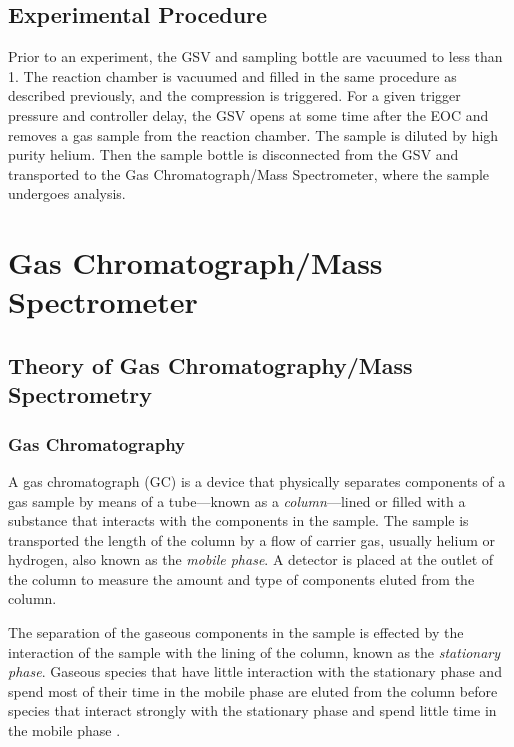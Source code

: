 \documentclass[../main.tex]{subfiles}
\begin{document}

\subsection{Experimental Procedure}

Prior to an experiment, the GSV and sampling bottle are vacuumed to less
than \SI{1}{\torr}. The reaction chamber is vacuumed and filled in the same
procedure as described previously, and the compression is triggered. For a given
trigger pressure and controller delay, the GSV opens at some time after the EOC
and removes a gas sample from the reaction chamber. The sample is diluted by
high purity helium. Then the sample bottle is disconnected from the GSV and transported
to the Gas Chromatograph/Mass Spectrometer, where the sample undergoes analysis.

\section{Gas Chromatograph/Mass Spectrometer}
\label{sec:gcms}

\subsection{Theory of Gas Chromatography/Mass Spectrometry}
\label{sec:gcms-theory}

\subsubsection{Gas Chromatography}

A gas chromatograph (GC) is a device that physically separates components
of a gas sample by means of a tube---known as a \textit{column}---lined or filled
with a substance that interacts with the components in the sample. The sample
is transported the length of the column by a flow of carrier gas, usually
helium or hydrogen, also known as the \textit{mobile phase}. A detector is
placed at the outlet of the column to measure the amount and type
of components eluted from the column.

The separation of the gaseous components in the sample is effected by
the interaction of the sample with the lining of the column, known as the
\textit{stationary phase}. Gaseous species that have little interaction with
the stationary phase and spend most of their time in the mobile phase
are eluted from the column before species that interact strongly with
the stationary phase and spend little time in the mobile phase \cite{Sparkman2011a}.
\end{document}
